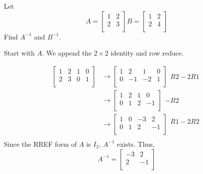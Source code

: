 \documentclass{article}
\begin{document}
\begin{example}
  Let
  \[
    A =
    \begin{bmatrix}
      1 & 2\\
      2 & 3\\
    \end{bmatrix}
    B =
    \begin{bmatrix}
      1 & 2\\
      2 & 4\\
    \end{bmatrix}
  \]
  Find $A^{-1}$ and $B^{-1}$.

  Start with $A$. We append the $2 \times 2$ identity and row reduce.

  \begin{align*}
    \left[
      \begin{array}{cc|cc}
        1 & 2 & 1 & 0\\
        2 & 3 & 0 & 1\\
      \end{array}
    \right]
    &\to
    \left[
      \begin{array}{cc|cc}
        1 & 2 & 1 & 0\\
        0 & -1 & -2 & 1\\
      \end{array}
    \right]
    \begin{matrix}
      \\
      R2 - 2R1\\
    \end{matrix}
    \\
    &\to
    \left[
      \begin{array}{cc|cc}
        1 & 2 & 1 & 0\\
        0 & 1 & 2 & -1\\
      \end{array}
    \right]
    \begin{matrix}
      \\
      -R2\\
    \end{matrix}
    \\
    &\to
    \left[
      \begin{array}{cc|cc}
        1 & 0 &  -3 & 2\\
        0 & 1 & 2 & -1\\
      \end{array}
    \right]
    \begin{matrix}
      R1 - 2R2\\
      \\
    \end{matrix}
    \\
  \end{align*}
  Since the RREF form of $A$ is $I_2$, $A^{-1}$ exists. Thus, \[
    A^{-1} =
    \begin{bmatrix}
      -3 & 2\\
      2 & -1\\
    \end{bmatrix}
  \]


\end{example}
\end{document}
